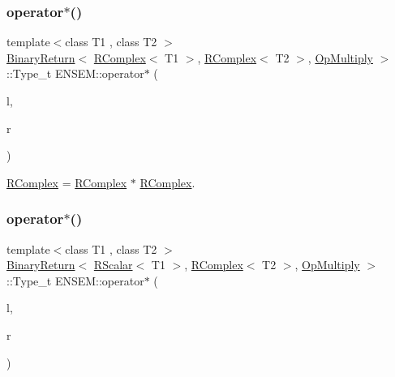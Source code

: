 \subsubsection{\texorpdfstring{operator$\ast$()}{operator*()}\hspace{0.1cm}{\footnotesize\ttfamily [1/3]}}
{\footnotesize\ttfamily template$<$class T1 , class T2 $>$ \\
\mbox{\hyperlink{structENSEM_1_1BinaryReturn}{Binary\+Return}}$<$ \mbox{\hyperlink{classENSEM_1_1RComplex}{R\+Complex}}$<$ T1 $>$, \mbox{\hyperlink{classENSEM_1_1RComplex}{R\+Complex}}$<$ T2 $>$, \mbox{\hyperlink{structENSEM_1_1OpMultiply}{Op\+Multiply}} $>$\+::Type\+\_\+t E\+N\+S\+E\+M\+::operator$\ast$ (\begin{DoxyParamCaption}\item[{const \mbox{\hyperlink{classENSEM_1_1RComplex}{R\+Complex}}$<$ T1 $>$ \&\+\_\+\+\_\+restrict\+\_\+\+\_\+}]{l,  }\item[{const \mbox{\hyperlink{classENSEM_1_1RComplex}{R\+Complex}}$<$ T2 $>$ \&\+\_\+\+\_\+restrict\+\_\+\+\_\+}]{r }\end{DoxyParamCaption})\hspace{0.3cm}{\ttfamily [inline]}}



\mbox{\hyperlink{classENSEM_1_1RComplex}{R\+Complex}} = \mbox{\hyperlink{classENSEM_1_1RComplex}{R\+Complex}} $\ast$ \mbox{\hyperlink{classENSEM_1_1RComplex}{R\+Complex}}. 

\mbox{\label{group__rcomplex_ga0d32e4173e14565f942b2e42ede11659}} 
\subsubsection{\texorpdfstring{operator$\ast$()}{operator*()}\hspace{0.1cm}{\footnotesize\ttfamily [2/3]}}
{\footnotesize\ttfamily template$<$class T1 , class T2 $>$ \\
\mbox{\hyperlink{structENSEM_1_1BinaryReturn}{Binary\+Return}}$<$ \mbox{\hyperlink{classENSEM_1_1RScalar}{R\+Scalar}}$<$ T1 $>$, \mbox{\hyperlink{classENSEM_1_1RComplex}{R\+Complex}}$<$ T2 $>$, \mbox{\hyperlink{structENSEM_1_1OpMultiply}{Op\+Multiply}} $>$\+::Type\+\_\+t E\+N\+S\+E\+M\+::operator$\ast$ (\begin{DoxyParamCaption}\item[{const \mbox{\hyperlink{classENSEM_1_1RScalar}{R\+Scalar}}$<$ T1 $>$ \&}]{l,  }\item[{const \mbox{\hyperlink{classENSEM_1_1RComplex}{R\+Complex}}$<$ T2 $>$ \&}]{r }\end{DoxyParamCaption})\hspace{0.3cm}{\ttfamily [inline]}}



